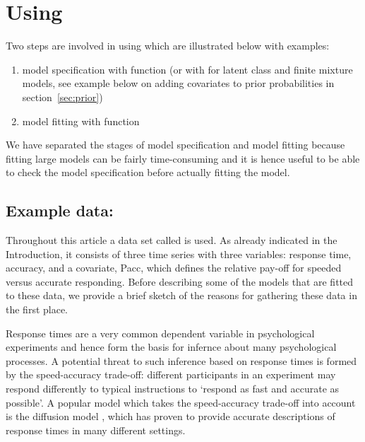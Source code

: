 \documentclass[article]{jss}
\begin{document}

\section[Using depmixS4]{Using }

Two steps are involved in using  which are illustrated
below with examples:
\begin{enumerate}
	\item model specification with function  (or with 
	for latent class and finite mixture models, see example below on adding
	covariates to prior probabilities in section~\ref{sec:prior})
	
	\item  model fitting with function 
\end{enumerate}
We have separated the stages of model specification and model fitting
because fitting large models can be fairly time-consuming and it is
hence useful to be able to check the model specification before
actually fitting the model.

\subsection[Example data: speed]{Example data: }

Throughout this article a data set called  is used.  As
already indicated in the Introduction, it consists of three time
series with three variables: response time, accuracy, and a covariate,
Pacc, which defines the relative pay-off for speeded versus accurate
responding.  Before describing some of the models that are fitted
to these data, we provide a brief sketch of the reasons for gathering
these data in the first place.

Response times are a very common dependent variable in psychological
experiments and hence form the basis for infernce about many
psychological processes.  A potential threat to such inference based
on response times is formed by the speed-accuracy trade-off: different
participants in an experiment may respond differently to typical
instructions to `respond as fast and accurate as possible'.  A popular
model which takes the speed-accuracy trade-off into account is the
diffusion model \citep{Ratcliff1978}, which has proven to provide
accurate descriptions of response times in many different settings.
\end{document}
